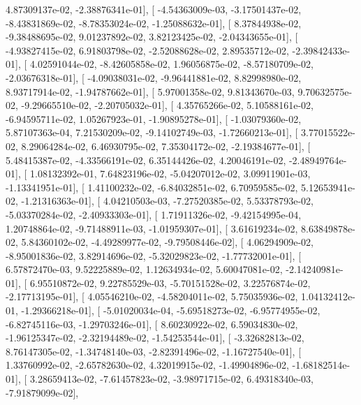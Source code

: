 \documentclass{article}
\begin{document}
          4.87309137e-02,  -2.38876341e-01],
       [ -4.54363009e-03,  -3.17501437e-02,  -8.43831869e-02,
         -8.78353024e-02,  -1.25088632e-01],
       [  8.37844938e-02,  -9.38488695e-02,   9.01237892e-02,
          3.82123425e-02,  -2.04343655e-01],
       [ -4.93827415e-02,   6.91803798e-02,  -2.52088628e-02,
          2.89535712e-02,  -2.39842433e-01],
       [  4.02591044e-02,  -8.42605858e-02,   1.96056875e-02,
         -8.57180709e-02,  -2.03676318e-01],
       [ -4.09038031e-02,  -9.96441881e-02,   8.82998980e-02,
          8.93717914e-02,  -1.94787662e-01],
       [  5.97001358e-02,   9.81343670e-03,   9.70632575e-02,
         -9.29665510e-02,  -2.20705032e-01],
       [  4.35765266e-02,   5.10588161e-02,  -6.94595711e-02,
          1.05267923e-01,  -1.90895278e-01],
       [ -1.03079360e-02,   5.87107363e-04,   7.21530209e-02,
         -9.14102749e-03,  -1.72660213e-01],
       [  3.77015522e-02,   8.29064284e-02,   6.46930795e-02,
          7.35304172e-02,  -2.19384677e-01],
       [  5.48415387e-02,  -4.33566191e-02,   6.35144426e-02,
          4.20046191e-02,  -2.48949764e-01],
       [  1.08132392e-01,   7.64823196e-02,  -5.04207012e-02,
          3.09911901e-03,  -1.13341951e-01],
       [  1.41100232e-02,  -6.84032851e-02,   6.70959585e-02,
          5.12653941e-02,  -1.21316363e-01],
       [  4.04210503e-03,  -7.27520385e-02,   5.53378793e-02,
         -5.03370284e-02,  -2.40933303e-01],
       [  1.71911326e-02,  -9.42154995e-04,   1.20748864e-02,
         -9.71488911e-03,  -1.01959307e-01],
       [  3.61619234e-02,   8.63849878e-02,   5.84360102e-02,
         -4.49289977e-02,  -9.79508446e-02],
       [  4.06294909e-02,  -8.95001836e-02,   3.82914696e-02,
         -5.32029823e-02,  -1.77732001e-01],
       [  6.57872470e-03,   9.52225889e-02,   1.12634934e-02,
          5.60047081e-02,  -2.14240981e-01],
       [  6.95510872e-02,   9.22785529e-03,  -5.70151528e-02,
          3.22576874e-02,  -2.17713195e-01],
       [  4.05546210e-02,  -4.58204011e-02,   5.75035936e-02,
          1.04132412e-01,  -1.29366218e-01],
       [ -5.01020034e-04,  -5.69518273e-02,  -6.95774955e-02,
         -6.82745116e-03,  -1.29703246e-01],
       [  8.60230922e-02,   6.59034830e-02,  -1.96125347e-02,
         -2.32194489e-02,  -1.54253544e-01],
       [ -3.32682813e-02,   8.76147305e-02,  -1.34748140e-03,
         -2.82391496e-02,  -1.16727540e-01],
       [  1.33760992e-02,  -2.65782630e-02,   4.32019915e-02,
         -1.49904896e-02,  -1.68182514e-01],
       [  3.28659413e-02,  -7.61457823e-02,  -3.98971715e-02,
          6.49318340e-03,  -7.91879099e-02],
\end{document}
